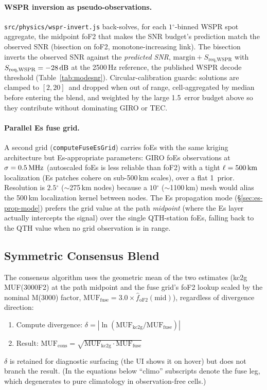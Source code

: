 \documentclass[11pt,a4paper]{article}
\newcommand{\SI}[2]{#1\,\text{#2}}
\newcommand{\si}[1]{\text{#1}}
\newcommand{\dB}{\text{dB}}
\newcommand{\MHz}{\text{MHz}}
\newcommand{\km}{\text{km}}
\newcommand{\degree}{\ensuremath{{}^\circ}}
\begin{document}
\paragraph{WSPR inversion as pseudo-observations.}
\texttt{src/physics/wspr-invert.js} back-solves, for each
$1\degree$-binned WSPR spot aggregate, the midpoint foF2 that
makes the SNR budget's prediction match the observed SNR
(bisection on foF2, monotone-increasing link).  The bisection
inverts the observed SNR against the \emph{predicted SNR},
$\text{margin} + S_{\text{req,WSPR}}$ with $S_{\text{req,WSPR}} =
\SI{-28}{\dB}$ at the 2500\,Hz reference, the published WSPR
decode threshold (Table~\ref{tab:modesnr}).  Circular-calibration
guards: solutions are clamped to $[2, 20]$\,\si{\MHz} and dropped
when out of range, cell-aggregated by median before entering the
blend, and weighted by the large \SI{1.5}{\MHz} error budget
above so they contribute without dominating GIRO or TEC.

\paragraph{Parallel Es fuse grid.}  A second grid
(\texttt{computeFuseEsGrid}) carries foEs with the same kriging
architecture but Es-appropriate parameters: GIRO foEs
observations at $\sigma = \SI{0.5}{\MHz}$ (autoscaled foEs is
less reliable than foF2) with a tight $\ell = \SI{500}{\km}$
localization (Es patches cohere on sub-500\,km scales), over a
flat \SI{1}{\MHz} prior.  Resolution is $2.5\degree$
(${\sim}$275\,km nodes) because a $10\degree$
(${\sim}$1100\,km) mesh would alias the 500\,km localization kernel
between nodes.  The Es propagation mode
(\S\ref{sec:es-prop-mode}) prefers the grid value at the path
\emph{midpoint} (where the Es layer actually intercepts the
signal) over the single QTH-station foEs, falling back to the
QTH value when no grid observation is in range.

\subsection{Symmetric Consensus Blend}\label{sec:muf-consensus}

The consensus algorithm uses the geometric mean of the two
estimates (kc2g MUF(3000F2) at the path midpoint and the fuse
grid's foF2 lookup scaled by the nominal M(3000) factor,
$\text{MUF}_{\text{fuse}} = 3.0 \times
\hat{f}_{\text{oF2}}(\text{mid})$), regardless of divergence
direction:
\begin{enumerate}[nosep]
  \item Compute divergence:
    $\delta = |\ln(\text{MUF}_{\text{kc2g}} / \text{MUF}_{\text{fuse}})|$
  \item Result:
    $\text{MUF}_{\text{cons}} = \sqrt{\text{MUF}_{\text{kc2g}} \cdot \text{MUF}_{\text{fuse}}}$
\end{enumerate}
$\delta$ is retained for diagnostic surfacing (the UI shows it on
hover) but does not branch the result.  (In the equations below
``climo'' subscripts denote the fuse leg, which degenerates to
pure climatology in observation-free cells.)
\end{document}

